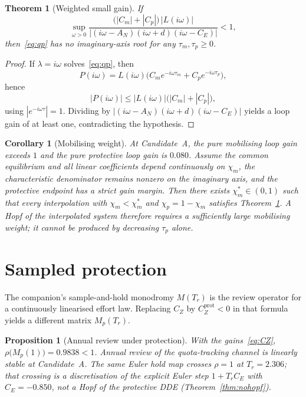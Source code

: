 \documentclass[11pt]{article}
\newtheorem{theorem}{Theorem}
\newtheorem{proposition}{Proposition}
\newtheorem{corollary}{Corollary}
\theoremstyle{definition}
\begin{document}
\begin{theorem}[Weighted small gain]
\label{thm:weighted}
If
\[
\sup_{\omega>0}\frac{\bigl(|C_m|+|C_p|\bigr)\,|L(i\omega)|}{|(i\omega-A_N)(i\omega+d)(i\omega-C_E)|}<1,
\]
then~\eqref{eq:qp} has no imaginary-axis root for any $\tau_m,\tau_p\ge 0$.
\end{theorem}

\begin{proof}
If $\lambda=i\omega$ solves~\eqref{eq:qp}, then
\[
P(i\omega)=L(i\omega)\bigl(C_m e^{-i\omega\tau_m}+C_p e^{-i\omega\tau_p}\bigr),
\]
hence
\[
|P(i\omega)|\le |L(i\omega)|\bigl(|C_m|+|C_p|\bigr),
\]
using $|e^{-i\omega\tau}|=1$. Dividing by $|(i\omega-A_N)(i\omega+d)(i\omega-C_E)|$ yields a loop gain of at least one, contradicting the hypothesis.
\end{proof}

\begin{corollary}[Mobilising weight]
\label{cor:weight}
At Candidate~A, the pure mobilising loop gain exceeds $1$ and the pure protective loop gain is $0.080$. Assume the common equilibrium and all linear coefficients depend continuously on $\chi_m$, the characteristic denominator remains nonzero on the imaginary axis, and the protective endpoint has a strict gain margin. Then there exists $\chi_m^*\in(0,1)$ such that every interpolation with $\chi_m<\chi_m^*$ and $\chi_p=1-\chi_m$ satisfies Theorem~\ref{thm:weighted}. A Hopf of the interpolated system therefore requires a sufficiently large mobilising weight; it cannot be produced by decreasing $\tau_p$ alone.
\end{corollary}

\section{Sampled protection}

The companion's sample-and-hold monodromy $M(T_r)$ is the review operator for a continuously linearised effort law. Replacing $C_Z$ by $C_Z^{\mathrm{prot}}<0$ in that formula yields a different matrix $M_p(T_r)$.

\begin{proposition}[Annual review under protection]
\label{prop:annual}
With the gains~\eqref{eq:CZ}, $\rho\bigl(M_p(1)\bigr)=0.9838<1$. Annual review of the quota-tracking channel is linearly stable at Candidate~A. The same Euler hold map crosses $\rho=1$ at $T_r=2.306$; that crossing is a discretisation of the explicit Euler step $1+T_r C_E$ with $C_E=-0.850$, not a Hopf of the protective DDE (Theorem~\ref{thm:nohopf}).
\end{proposition}
\end{document}
